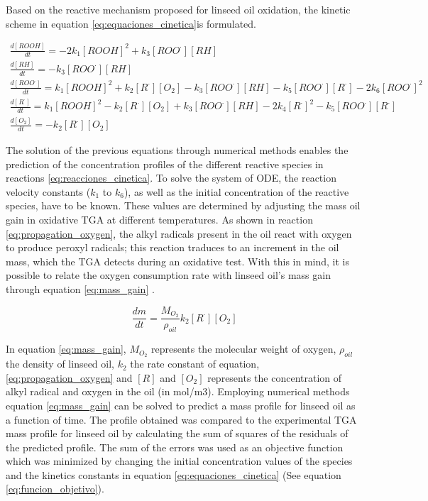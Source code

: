 \begin{refsection}
Based on the reactive mechanism proposed for linseed oil oxidation, the kinetic scheme in equation \ref{eq:equaciones_cinetica}is formulated. 

\begin{subequations}
\begin{gather}
    \frac{d[ROOH]}{dt}=-2k_1[ROOH]^2+k_3[ROO^\cdot][RH]\\
    \frac{d[RH]}{dt}=-k_3[ROO^\cdot][RH]\\
    \frac{d[ROO^\cdot]}{dt}=k_1[ROOH]^2+k_2[R^\cdot][O_2]-k_3[ROO^\cdot][RH]-k_5[ROO^\cdot][R^\cdot]-2k_6[ROO^\cdot]^2\\
    \frac{d[R^\cdot]}{dt}=k_1[ROOH]^2-k_2[R^\cdot][O_2]+k_3[ROO^\cdot][RH]-2k_4[R^\cdot]^2-k_5[ROO^\cdot][R^\cdot]\\
    \frac{d[O_2]}{dt}=-k_2[R^\cdot][O_2]
\end{gather}
\label{eq:equaciones_cinetica}
\end{subequations}

The solution of the previous equations through numerical methods enables the prediction of the concentration profiles of the different reactive species in reactions \ref{eq:reacciones_cinetica}. To solve the system of ODE,  the reaction velocity constants ($k_1$ to $k_6$), as well as the initial concentration of the reactive species, have to be known. These values are determined by adjusting the mass oil gain in oxidative TGA at different temperatures. As shown in reaction \ref{eq:propagation_oxygen}, the alkyl radicals present in the oil react with oxygen to produce peroxyl radicals; this reaction traduces to an increment in the oil mass, which the TGA detects during an oxidative test. With this in mind, it is possible to relate the oxygen consumption rate with linseed oil's mass gain through equation \ref{eq:mass_gain} . 

\begin{equation}
    \frac{dm}{dt}=\frac{M_{O_{2}}}{\rho_{oil}}k_2[R^\cdot][O_2]
    \label{eq:mass_gain}
\end{equation}

In equation \ref{eq:mass_gain},  $M_{O_{2}}$ represents the molecular weight of oxygen, $\rho_{oil}$ the density of linseed oil, $k_2$ the rate constant of equation,\ref{eq:propagation_oxygen} and $[R]$ and $[O_2]$ represents the concentration of alkyl radical and oxygen in the oil (in mol/m3). Employing numerical methods equation \ref{eq:mass_gain} can be solved to predict a mass profile for linseed oil as a function of time.  The profile obtained was compared to the experimental TGA mass profile for linseed oil by calculating the sum of squares of the residuals of the predicted profile. The sum of the errors was used as an objective function which was minimized by changing the initial concentration values of the species and the kinetics constants in equation \ref{eq:equaciones_cinetica} (See equation \ref{eq:funcion_objetivo}). 


\end{refsection}
